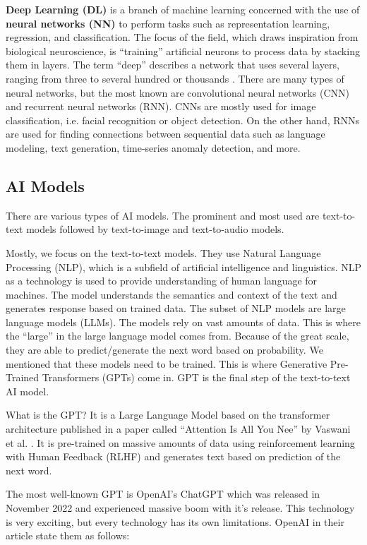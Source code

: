 \textbf{Deep Learning (DL)} is a branch of machine learning concerned with the use of \textbf{neural networks (NN)} to perform tasks such as representation learning, regression, and classification. The focus of the field, which draws inspiration from biological neuroscience, is ``training'' artificial neurons to process data by stacking them in layers. The term ``deep'' describes a network that uses several layers, ranging from three to several hundred or thousands \cite{LeCun2015}. There are many types of neural networks, but the most known are convolutional neural networks (CNN) and recurrent neural networks (RNN). CNNs are mostly used for image classification, i.e. facial recognition or object detection. On the other hand, RNNs are used for finding connections between sequential data such as language modeling, text generation, time-series anomaly detection, and more.


\subsection{AI Models \label{subsec:AI-Models}}

There are various types of AI models. The prominent and most used are text-to-text models followed by text-to-image and text-to-audio models. 

Mostly, we focus on the text-to-text models. They use Natural Language Processing (NLP), which is a subfield of artificial intelligence and linguistics. NLP as a technology is used to provide understanding of human language for machines. The model understands the semantics and context of the text and generates response based on trained data. The subset of NLP models are large language models (LLMs). The models rely on vast amounts of data. This is where the ``large'' in the large language model comes from. Because of the great scale, they are able to predict/generate the next word based on probability. We mentioned that these models need to be trained. This is where Generative Pre-Trained Transformers (GPTs) come in. GPT is the final step of the text-to-text AI model. 

What is the GPT? It is a Large Language Model based on the transformer architecture published in a paper called ``Attention Is All You Nee'' by Vaswani et al. \cite{vaswani2023attentionneed}. It is pre-trained on massive amounts of data using reinforcement learning with Human Feedback (RLHF) \cite{openai_chatgpt_page} and generates text based on prediction of the next word.

The most well-known GPT is OpenAI's ChatGPT which was released in November 2022 and experienced massive boom with it's release. This technology is very exciting, but every technology has its own limitations. OpenAI in their article \cite{openai_chatgpt_page} state them as follows:

